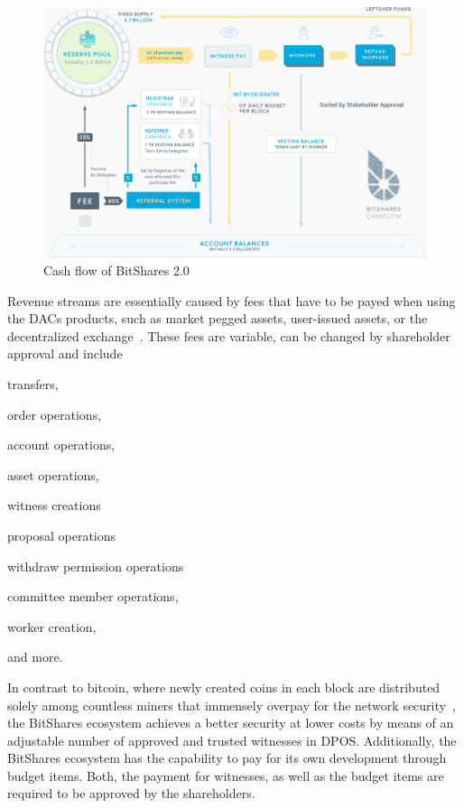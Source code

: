\label{sec:bts:revenue:expenses}

\begin{figure}[!htp]
 \centering
 \includegraphics[width=.8\linewidth]{figures/cashflow.png}
 \caption{Cash flow of BitShares 2.0}
 \label{fig:cashflow}
\end{figure}

Revenue streams are essentially caused by fees that have to be payed when using
the DACs products, such as market pegged assets, user-issued assets, or the
decentralized exchange~\cite{bts:financial}. These fees are variable, can be
changed by shareholder approval and include
\begin{inparaenum}[(a)]
 \item transfers,
 \item order operations,
 \item account operations,
 \item asset operations,
 \item witness creations
 \item proposal operations
 \item withdraw permission operations
 \item committee member operations,
 \item worker creation,
\end{inparaenum}
and more.

In contrast to bitcoin, where newly created coins in each block are distributed
solely among countless miners that immensely overpay for the network
security~\cite{ltb:dac}, the BitShares ecosystem achieves a better security at
lower costs by means of an adjustable number of approved and trusted witnesses
in DPOS. Additionally, the BitShares ecosystem has the capability to pay for
its own development through budget items. Both, the payment for witnesses, as
well as the budget items are required to be approved by the shareholders.

